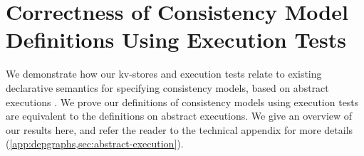 \section{Correctness of Consistency Model Definitions Using Execution Tests}
\label{sec:other_formalisms}

We demonstrate how our kv-stores and execution 
tests relate to existing declarative semantics for specifying  
consistency models, based on abstract executions \cite{framework-concur}. 
We prove our definitions of consistency models using execution tests
are equivalent to the definitions on abstract executions.
We give an overview of our results here, and refer the reader to the technical
appendix for more details (\cref{app:depgraphs,sec:abstract-execution}).


